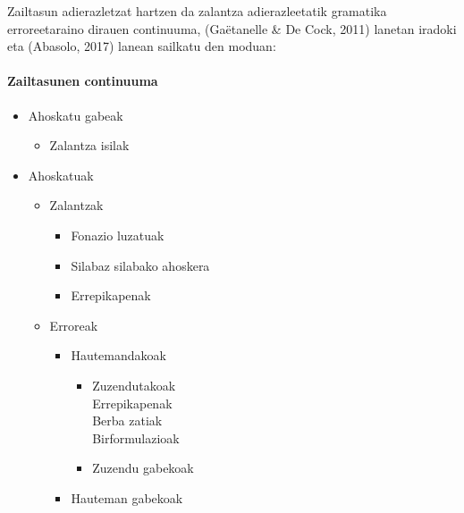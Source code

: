 \documentclass[]{article}
\providecommand{\tightlist}{%
  \setlength{\itemsep}{0pt}\setlength{\parskip}{0pt}}
\let\oldparagraph\paragraph
\renewcommand{\paragraph}[1]{\oldparagraph{#1}\mbox{}}
\begin{document}
Zailtasun adierazletzat hartzen da zalantza adierazleetatik gramatika
erroreetaraino dirauen continuuma, (Gaëtanelle \& De Cock, 2011) lanetan
iradoki eta (Abasolo, 2017) lanean sailkatu den moduan:

\paragraph{Zailtasunen continuuma}\label{zailtasunen-continuuma}

\begin{itemize}
\tightlist
\item
  Ahoskatu gabeak

  \begin{itemize}
  \tightlist
  \item
    Zalantza isilak
  \end{itemize}
\item
  Ahoskatuak

  \begin{itemize}
  \tightlist
  \item
    Zalantzak

    \begin{itemize}
    \tightlist
    \item
      Fonazio luzatuak
    \item
      Silabaz silabako ahoskera
    \item
      Errepikapenak
    \end{itemize}
  \item
    Erroreak

    \begin{itemize}
    \tightlist
    \item
      Hautemandakoak

      \begin{itemize}
      \tightlist
      \item
        Zuzendutakoak\\
        Errepikapenak\\
        Berba zatiak\\
        Birformulazioak\\
      \item
        Zuzendu gabekoak
      \end{itemize}
    \item
      Hauteman gabekoak
    \end{itemize}
  \end{itemize}
\end{itemize}
\end{document}
